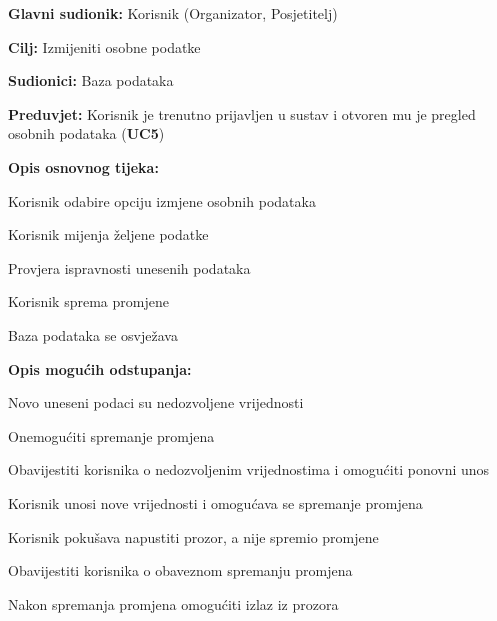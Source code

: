 
\noindent {}
\begin{packed_item}
	
	\item \textbf{Glavni sudionik:} Korisnik (Organizator, Posjetitelj)
	\item  \textbf{Cilj:} Izmijeniti osobne podatke 
	\item  \textbf{Sudionici:} Baza podataka
	\item  \textbf{Preduvjet:} Korisnik je trenutno prijavljen u sustav i otvoren mu je pregled osobnih podataka (\textbf{UC5})
	\item  \textbf{Opis osnovnog tijeka:}
	
	\item[] \begin{packed_enum}
		
		\item Korisnik odabire opciju izmjene osobnih podataka
		\item Korisnik mijenja željene podatke 
		\item Provjera ispravnosti unesenih podataka 
		\item Korisnik sprema promjene
		\item Baza podataka se osvježava 
		
	\end{packed_enum}
	
	\item  \textbf{Opis mogućih odstupanja:}
	
	\item[] \begin{packed_item}
		
		\item[2.a] Novo uneseni podaci su nedozvoljene vrijednosti
		\item[] \begin{packed_enum}
			
			\item Onemogućiti spremanje promjena
			\item Obavijestiti korisnika o nedozvoljenim vrijednostima i omogućiti ponovni unos 
			\item Korisnik unosi nove vrijednosti i omogućava se spremanje promjena
			
		\end{packed_enum}
		
		\item[4.a] Korisnik pokušava napustiti prozor, a nije spremio promjene 
		\item[] \begin{packed_enum}
			
			\item Obavijestiti korisnika o obaveznom spremanju promjena
			\item Nakon spremanja promjena omogućiti izlaz iz prozora
			
		\end{packed_enum}
		
	\end{packed_item}
	
\end{packed_item}

